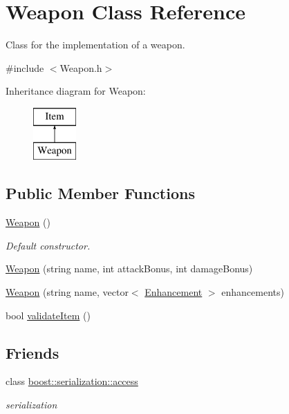 \hypertarget{class_weapon}{}\section{Weapon Class Reference}
\label{class_weapon}


Class for the implementation of a weapon.  




{\ttfamily \#include $<$Weapon.\+h$>$}

Inheritance diagram for Weapon\+:\begin{figure}[H]
\begin{center}
\leavevmode
\includegraphics[height=2.000000cm]{class_weapon}
\end{center}
\end{figure}
\subsection*{Public Member Functions}
\begin{DoxyCompactItemize}
\item 
\hypertarget{class_weapon_a42dbc46dd70319a24763992c4ebbd396}{}\label{class_weapon_a42dbc46dd70319a24763992c4ebbd396} 
\hyperlink{class_weapon_a42dbc46dd70319a24763992c4ebbd396}{Weapon} ()
\begin{DoxyCompactList}\small\item\em Default constructor. \end{DoxyCompactList}\item 
\hyperlink{class_weapon_ad3c6f6756018c1c3ad316aaa26aae972}{Weapon} (string name, int attack\+Bonus, int damage\+Bonus)
\item 
\hyperlink{class_weapon_aa713aefb98583e759336a4d8338bfbcf}{Weapon} (string name, vector$<$ \hyperlink{class_enhancement}{Enhancement} $>$ enhancements)
\item 
bool \hyperlink{class_weapon_afa7ce016c3cba686399cbe57628f8c70}{validate\+Item} ()
\end{DoxyCompactItemize}
\subsection*{Friends}
\begin{DoxyCompactItemize}
\item 
\hypertarget{class_weapon_ac98d07dd8f7b70e16ccb9a01abf56b9c}{}\label{class_weapon_ac98d07dd8f7b70e16ccb9a01abf56b9c} 
class \hyperlink{class_weapon_ac98d07dd8f7b70e16ccb9a01abf56b9c}{boost\+::serialization\+::access}
\begin{DoxyCompactList}\small\item\em serialization \end{DoxyCompactList}\end{DoxyCompactItemize}
